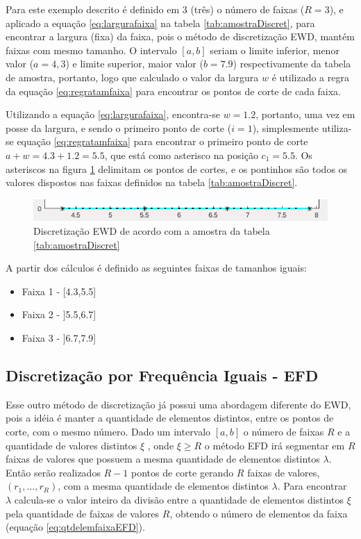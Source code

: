 Para este exemplo descrito é definido em 3 (três) o número de faixas (${R=3}$), e aplicado a equação \ref{eq:largurafaixa} na tabela \ref{tab:amostraDiscret}, para encontrar a largura (fixa) da faixa, pois o método de discretização EWD, mantém faixas com mesmo tamanho. O intervalo ${[a,b]}$ seriam o limite inferior, menor valor (${a=4,3}$) e limite superior, maior valor (${b=7.9}$) respectivamente da tabela de amostra, portanto, logo que calculado o valor da largura ${w}$ é utilizado a regra da equação \ref{eq:regratamfaixa} para encontrar os pontos de corte de cada faixa.

Utilizando a equação \ref{eq:largurafaixa}, encontra-se ${w=1.2}$, portanto, uma vez em posse da largura, e sendo o primeiro ponto de corte (${i=1}$), simplesmente utiliza-se equação \ref{eq:regratamfaixa} para encontrar o primeiro ponto de corte ${a+w = 4.3 + 1.2 = 5.5}$, que está como asterisco na posição ${c_1=5.5}$. Os asteriscos na figura \ref{fig:faixasFihseririsExemploEWD} delimitam os pontos de cortes, e os pontinhos são todos os valores dispostos nas faixas definidos na tabela \ref{tab:amostraDiscret}.

\begin{figure}[h] 
        \centering
        \includegraphics[scale=0.8]{figs/ewd_fisheriris_col1.png}
        \caption{Discretização EWD de acordo com a amostra da tabela \ref{tab:amostraDiscret}}%
        \label{fig:faixasFihseririsExemploEWD}
\end{figure}

A partir dos cálculos é definido as seguintes faixas de tamanhos iguais:
\begin{itemize}[noitemsep]
 \item Faixa 1 - [4.3,5.5]
 \item Faixa 2 - ]5.5,6.7]
 \item Faixa 3 - ]6.7,7.9]
\end{itemize}


\subsection{Discretização por Frequência Iguais - EFD}\label{cap:refTeor:subsec:efd}

Esse outro método de discretização já possui uma abordagem diferente do EWD, pois a idéia é manter a quantidade de elementos distintos, entre os pontos de corte, com o mesmo número. Dado um intervalo ${[a,b]}$ o número de faixas ${R}$ e a quantidade de valores distintos ${\xi}$ , onde ${\xi \geqslant R}$ o método EFD irá segmentar em  ${R}$ faixas de valores que possuem a mesma quantidade de elementos distintos ${\lambda}$. Então serão realizados ${R-1}$ pontos de corte gerando ${R}$ faixas de valores, ${(r_1,...,r_R)}$, com a mesma quantidade de elementos distintos ${\lambda}$. Para encontrar ${\lambda}$ calcula-se o valor inteiro da divisão entre a quantidade de elementos distintos ${\xi}$ pela quantidade de faixas de valores ${R}$, obtendo o número de elementos da faixa (equação \ref{eq:qtdelemfaixaEFD}).

